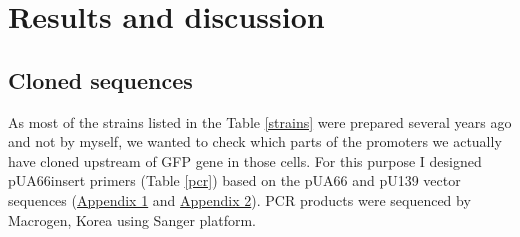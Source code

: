 \chapter{Results and discussion}

\shorthandoff{-} 

\section{Cloned  sequences}
As most of the strains listed in the Table \ref{strains} were prepared several years ago and not by myself, we wanted to check which parts of the promoters we actually have cloned upstream of GFP gene in those cells.
For this purpose I designed pUA66\textunderscore insert primers (Table \ref{pcr}) based on the pUA66 and pU139 vector sequences (\hyperlink{pUA66seq}{Appendix 1} and \hyperlink{pUA66seq}{Appendix 2}).
PCR products were sequenced by Macrogen, Korea using Sanger platform.

